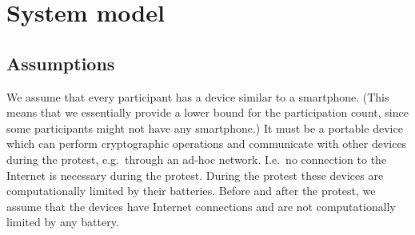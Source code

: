 \mode*

\section{System model}%
\label{SystemModel}

\subsection{Assumptions}

We assume that every participant has a device similar to a smartphone.
(This means that we essentially provide a lower bound for the participation 
count, since some participants might not have any smartphone.)
It must be a portable device which can perform cryptographic operations and 
communicate with other devices during the protest, e.g.\ through an ad-hoc 
network.
I.e.\ no connection to the Internet is necessary during the protest.
During the protest these devices are computationally limited by their 
batteries.
Before and after the protest, we assume that the devices have Internet 
connections and are not computationally limited by any battery.


